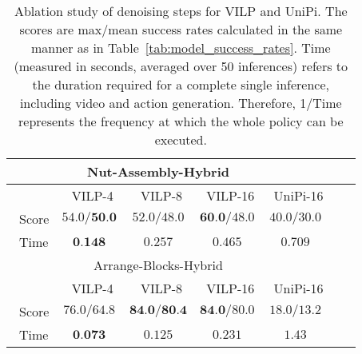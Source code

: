 \documentclass[doublecolumn]{IEEEtran}
\begin{document}
\begin{table}[t]
\centering
\begin{tabular}{lcccccc}
\hline
 &  \multicolumn{3}{c}{{Nut-Assembly-Hybrid}}& \\
\hline
 & \ {VILP-4} & \ {VILP-8} & \ {VILP-16} &\ {UniPi-16} \\
\hline
\ {Score}  & $54.0/\textbf{50.0}$ & $52.0/48.0$ & $\textbf{60.0}/48.0$ & $40.0/30.0$  \\
\ {Time} & $\textbf{0.148}$& $0.257$& $0.465$  & $0.709$  \\
\hline
 &  \multicolumn{3}{c}{{Arrange-Blocks-Hybrid}}& \\
\hline
 & \ {VILP-4} & \ {VILP-8} & \ {VILP-16} &\ {UniPi-16} \\
\hline
\ {Score} & $76.0/64.8$ & $\textbf{84.0/80.4}$ & $\textbf{84.0}/80.0$ & $18.0/13.2$  \\
\ {Time}  & $\textbf{0.073}$ & $0.125$ & $0.231$ & $1.43$  \\
\hline
\end{tabular}
\caption{Ablation study of denoising steps for VILP and UniPi. The scores are {max/mean} success rates calculated in the same manner as in Table~\ref{tab:model_success_rates}. Time (measured in seconds, averaged over 50 inferences) refers to the duration required for a complete single inference, including video and action generation. Therefore, 1/Time represents the frequency at which the whole policy can be executed.}
\label{tab:denoising_benchmark}
\end{table}
\end{document}
